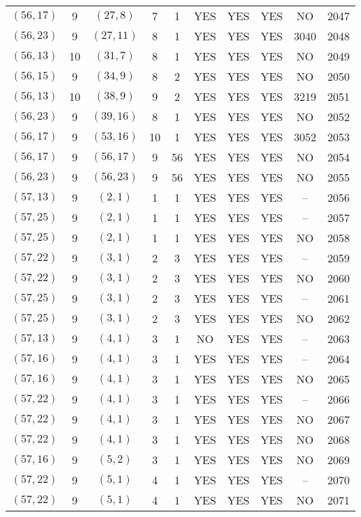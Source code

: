 \begin{longtable}{|c|c|c|c|c|c|c|c|c|c|}
$(56, 17)$ & 9 & $(27, 8)$ & 7 & 1 & YES & YES & YES & NO & 2047\\
$(56, 23)$ & 9 & $(27, 11)$ & 8 & 1 & YES & YES & YES & 3040 & 2048\\
$(56, 13)$ & 10 & $(31, 7)$ & 8 & 1 & YES & YES & YES & NO & 2049\\
$(56, 15)$ & 9 & $(34, 9)$ & 8 & 2 & YES & YES & YES & NO & 2050\\
$(56, 13)$ & 10 & $(38, 9)$ & 9 & 2 & YES & YES & YES & 3219 & 2051\\
$(56, 23)$ & 9 & $(39, 16)$ & 8 & 1 & YES & YES & YES & NO & 2052\\
$(56, 17)$ & 9 & $(53, 16)$ & 10 & 1 & YES & YES & YES & 3052 & 2053\\
$(56, 17)$ & 9 & $(56, 17)$ & 9 & 56 & YES & YES & YES & NO & 2054\\
$(56, 23)$ & 9 & $(56, 23)$ & 9 & 56 & YES & YES & YES & NO & 2055\\
$(57, 13)$ & 9 & $(2, 1)$ & 1 & 1 & YES & YES & YES & -- & 2056\\
$(57, 25)$ & 9 & $(2, 1)$ & 1 & 1 & YES & YES & YES & -- & 2057\\
$(57, 25)$ & 9 & $(2, 1)$ & 1 & 1 & YES & YES & YES & NO & 2058\\
$(57, 22)$ & 9 & $(3, 1)$ & 2 & 3 & YES & YES & YES & -- & 2059\\
$(57, 22)$ & 9 & $(3, 1)$ & 2 & 3 & YES & YES & YES & NO & 2060\\
$(57, 25)$ & 9 & $(3, 1)$ & 2 & 3 & YES & YES & YES & -- & 2061\\
$(57, 25)$ & 9 & $(3, 1)$ & 2 & 3 & YES & YES & YES & NO & 2062\\
$(57, 13)$ & 9 & $(4, 1)$ & 3 & 1 & NO & YES & YES & -- & 2063\\
$(57, 16)$ & 9 & $(4, 1)$ & 3 & 1 & YES & YES & YES & -- & 2064\\
$(57, 16)$ & 9 & $(4, 1)$ & 3 & 1 & YES & YES & YES & NO & 2065\\
$(57, 22)$ & 9 & $(4, 1)$ & 3 & 1 & YES & YES & YES & -- & 2066\\
$(57, 22)$ & 9 & $(4, 1)$ & 3 & 1 & YES & YES & YES & NO & 2067\\
$(57, 22)$ & 9 & $(4, 1)$ & 3 & 1 & YES & YES & YES & NO & 2068\\
$(57, 16)$ & 9 & $(5, 2)$ & 3 & 1 & YES & YES & YES & NO & 2069\\
$(57, 22)$ & 9 & $(5, 1)$ & 4 & 1 & YES & YES & YES & -- & 2070\\
$(57, 22)$ & 9 & $(5, 1)$ & 4 & 1 & YES & YES & YES & NO & 2071\\

\end{longtable}
